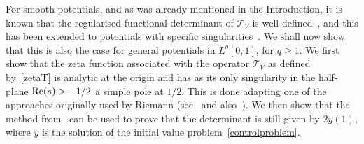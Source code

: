 \documentclass[10pt,a4paper]{amsart}
\theoremstyle{plain}
\theoremstyle{definition}
\newcommand{\ttt}{\mathscr{T}}
\let\balpha q
\begin{document}
For smooth potentials, and as was already mentioned in the Introduction, it is known that the regularised functional determinant of $\ttt_V$ is
well-defined~\cite{BFK,Levit-Smilansky}, and this has been extended to potentials with specific singularities~\cite{Lesch,Lesch-Tolk}.
We shall now show that this is also the case for general potentials in $L^\balpha[0,1]$, for $\balpha\geq 1$. We first show that the
zeta function associated with the operator $\ttt_V$ as defined by~\eqref{zetaT} is analytic at the origin and has as its only singularity
in the half-plane $\re(s)>-1/2$ a simple pole at $1/2$. This is done adapting one of the approaches originally used by Riemann (see~\cite{riem}
and also~\cite[p.\,21ff]{titc}). We then show that the method from~\cite{Levit-Smilansky} can be used to prove that the determinant is still given by $2y(1)$,
where $y$ is the solution of the initial value problem~\eqref{controlproblem}.
\end{document}
